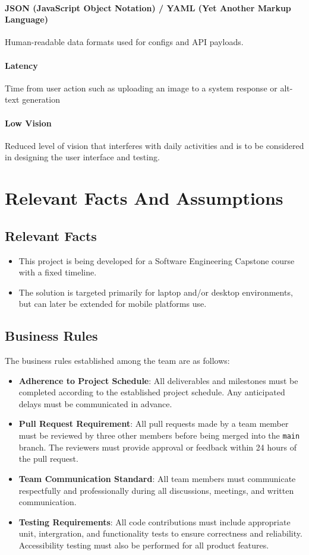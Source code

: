 \documentclass[12pt]{article}
\begin{document}
\paragraph*{JSON (JavaScript Object Notation) / YAML (Yet Another Markup Language)}
Human-readable data formats used for configs and API payloads.

\paragraph*{Latency}
Time from user action such as uploading an image to a system response or alt-text generation

\paragraph*{Low Vision}
Reduced level of vision that interferes with daily activities and is to be considered in designing the user interface and testing.

\section{Relevant Facts And Assumptions}
\subsection{Relevant Facts}
\begin{itemize}
  \item This project is being developed for a Software Engineering
    Capstone course with a fixed timeline.
  \item The solution is targeted primarily for laptop and/or desktop
    environments, but can later be extended for mobile platforms use.
\end{itemize}
\subsection{Business Rules}
The business rules established among the team are as follows:
\begin{itemize}
  \item \textbf{Adherence to Project Schedule}: All deliverables and
    milestones must be
    completed according to the established project schedule. Any
    anticipated delays must be communicated
    in advance.
  \item \textbf{Pull Request Requirement}: All pull requests made by
    a team member must be reviewed by
    three other members before being merged into the \texttt{main}
    branch. The reviewers must provide approval
    or feedback within 24 hours of the pull request.
  \item \textbf{Team Communication Standard}: All team members must
    communicate respectfully and professionally during
    all discussions, meetings, and written communication.
  \item \textbf{Testing Requirements}: All code contributions must
    include appropriate unit, intergration, and
    functionality tests to ensure correctness and reliability.
    Accessibility testing must also be performed for all
    product features.
\end{itemize}
\end{document}
